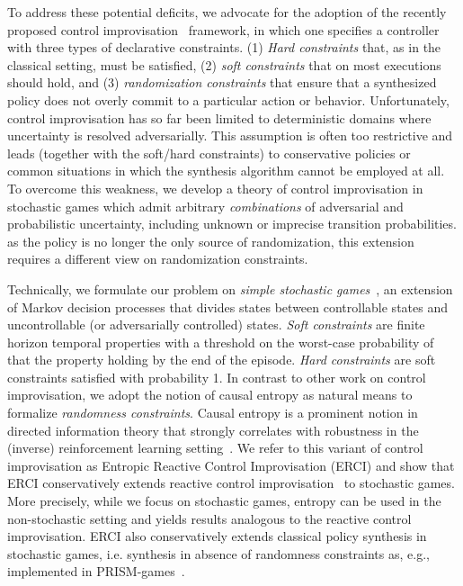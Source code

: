 To address these potential deficits, we advocate for the adoption of
the recently proposed control
improvisation~\cite{DBLP:conf/cav/FremontS18,DBLP:conf/fsttcs/FremontDSW15}
framework, in which one specifies a controller with three types of
declarative constraints. (1) \emph{Hard constraints} that, as in the
classical setting, must be satisfied, (2) \emph{soft constraints} that
on most executions should hold, and (3) \emph{randomization
constraints} that ensure that a synthesized policy does not overly
commit to a particular action or behavior. Unfortunately, control
improvisation has so far been limited to deterministic domains where
uncertainty is resolved adversarially. This assumption is often too
restrictive and leads (together with the soft/hard constraints) to
conservative policies or common situations in which the synthesis
algorithm cannot be employed at all. To overcome this weakness, we
develop a theory of control improvisation in stochastic games which
admit arbitrary \emph{combinations} of adversarial and probabilistic
uncertainty, including unknown or imprecise transition
probabilities. as the policy is no longer the only
source of randomization, this extension requires a different
view on randomization constraints.

Technically, we formulate our problem on \emph{simple stochastic
games}~\cite{DBLP:conf/dimacs/Condon90}, an extension of Markov decision processes that divides states
between controllable states and uncontrollable (or adversarially
controlled) states. \emph{Soft constraints} are finite horizon
temporal properties with a threshold on the worst-case probability of
that the property holding by the end of the episode. \emph{Hard
constraints} are soft constraints satisfied with probability 1. In
contrast to other work on control improvisation, we adopt the notion
of causal entropy as natural means to formalize \emph{randomness
constraints}.  Causal entropy is a prominent notion in directed
information theory  that strongly correlates with robustness in the
(inverse) reinforcement learning setting~\cite{mceThesis,
maxEntAnswer}. We refer to this variant of control improvisation as
Entropic Reactive Control Improvisation (ERCI) and show that ERCI
conservatively extends reactive control improvisation~\cite{DBLP:conf/cav/FremontS18} to stochastic
games. More precisely, while we focus on stochastic games, entropy can
be used in the non-stochastic setting and yields results analogous to
the reactive control improvisation. ERCI also conservatively extends  classical policy synthesis in stochastic games, i.e. synthesis in absence of randomness constraints as, e.g., implemented in PRISM-games~\cite{DBLP:journals/sttt/KwiatkowskaPW18}.



